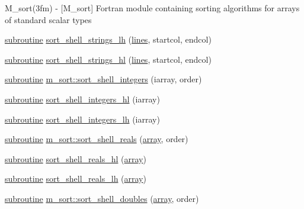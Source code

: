 \begin{DoxyCompactItemize}
\begin{DoxyCompactList}
M\+\_\+sort(3fm) -\/ \mbox{[}M\+\_\+sort\mbox{]} Fortran module containing sorting algorithms for arrays of standard scalar types \end{DoxyCompactList}\item 
\hyperlink{M__stopwatch_83_8txt_acfbcff50169d691ff02d4a123ed70482}{subroutine} \hyperlink{M__sort_8f90_a4a1eed2e76f3429d7eb5cd2ae5b50fa1}{sort\+\_\+shell\+\_\+strings\+\_\+lh} (\hyperlink{ufpp__overview_81_8txt_a38547e77f801e6266edc9bcd56b63a00}{lines}, startcol, endcol)
\item 
\hyperlink{M__stopwatch_83_8txt_acfbcff50169d691ff02d4a123ed70482}{subroutine} \hyperlink{M__sort_8f90_a16bd54666fe44ae00984394bdeb454b1}{sort\+\_\+shell\+\_\+strings\+\_\+hl} (\hyperlink{ufpp__overview_81_8txt_a38547e77f801e6266edc9bcd56b63a00}{lines}, startcol, endcol)
\item 
\hyperlink{M__stopwatch_83_8txt_acfbcff50169d691ff02d4a123ed70482}{subroutine} \hyperlink{namespacem__sort_a773068829c7fadb4ce29916c90d3bccb}{m\+\_\+sort\+::sort\+\_\+shell\+\_\+integers} (iarray, order)
\item 
\hyperlink{M__stopwatch_83_8txt_acfbcff50169d691ff02d4a123ed70482}{subroutine} \hyperlink{M__sort_8f90_a769d2663d17b93f45135e63626180ee4}{sort\+\_\+shell\+\_\+integers\+\_\+hl} (iarray)
\item 
\hyperlink{M__stopwatch_83_8txt_acfbcff50169d691ff02d4a123ed70482}{subroutine} \hyperlink{M__sort_8f90_a70ecc76a57b8e40ef2343a5e3eb6888e}{sort\+\_\+shell\+\_\+integers\+\_\+lh} (iarray)
\item 
\hyperlink{M__stopwatch_83_8txt_acfbcff50169d691ff02d4a123ed70482}{subroutine} \hyperlink{namespacem__sort_a121b04051b2a45b872da41884394374f}{m\+\_\+sort\+::sort\+\_\+shell\+\_\+reals} (\hyperlink{intro__blas1_83_8txt_a89db1945e1a335ab0184c6a097821e32}{array}, order)
\item 
\hyperlink{M__stopwatch_83_8txt_acfbcff50169d691ff02d4a123ed70482}{subroutine} \hyperlink{M__sort_8f90_a63fb4486f21d271616dd3d9ae7d1d90f}{sort\+\_\+shell\+\_\+reals\+\_\+hl} (\hyperlink{intro__blas1_83_8txt_a89db1945e1a335ab0184c6a097821e32}{array})
\item 
\hyperlink{M__stopwatch_83_8txt_acfbcff50169d691ff02d4a123ed70482}{subroutine} \hyperlink{M__sort_8f90_ab8554ae60b996aa5dea2c52607efa551}{sort\+\_\+shell\+\_\+reals\+\_\+lh} (\hyperlink{intro__blas1_83_8txt_a89db1945e1a335ab0184c6a097821e32}{array})
\item 
\hyperlink{M__stopwatch_83_8txt_acfbcff50169d691ff02d4a123ed70482}{subroutine} \hyperlink{namespacem__sort_a4fb0b2cae309adcc0f8af5ad86a50ec8}{m\+\_\+sort\+::sort\+\_\+shell\+\_\+doubles} (\hyperlink{intro__blas1_83_8txt_a89db1945e1a335ab0184c6a097821e32}{array}, order)

\end{DoxyCompactItemize}
